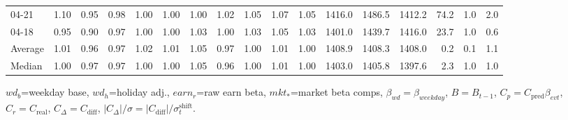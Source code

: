 \begin{threeparttable}
{\begin{tabular}{lrrrrrrrrrrrrrrrr}
  04-21 &   1.10 &   0.95 &         0.98 &     1.00 &           1.00 &        1.00 &        1.02 &        1.05 &          1.07 &          1.05 & 1416.0 & 1486.5 & 1412.2 &       74.2 &                      1.0 &                 2.0 \\
  04-18 &   0.95 &   0.90 &         0.97 &     1.00 &           1.00 &        1.03 &        1.00 &        1.03 &          1.05 &          1.03 & 1401.0 & 1439.7 & 1416.0 &       23.7 &                      1.0 &                 0.6 \\
Average &   1.01 &   0.96 &         0.97 &     1.02 &           1.01 &        1.05 &        0.97 &        1.00 &          1.01 &          1.00 & 1408.9 & 1408.3 & 1408.0 &        0.2 &                      0.1 &                 1.1 \\
 Median &   1.00 &   0.97 &         0.97 &     1.00 &           1.00 &        1.05 &        0.96 &        1.00 &          1.01 &          1.00 & 1403.0 & 1405.8 & 1397.6 &        2.3 &                      1.0 &                 1.0 \\
\bottomrule
\end{tabular}
}
\begin{tablenotes}\footnotesize
\item $wd_b$=weekday base, $wd_h$=holiday adj.,
$earn_r$=raw earn beta, $mkt_{*}$=market beta comps,
$\beta_{wd}=\beta_{weekday}$, $B=B_{t-1}$,
$C_p=C_{\text{pred}}\beta_{evt}$, $C_r=C_{\text{real}}$,
$C_\Delta=C_{\text{diff}}$, $|C_\Delta|/\sigma=|C_{\text{diff}}|/\sigma_t^{\text{shift}}$.
\end{tablenotes}
\end{threeparttable}
\endgroup
